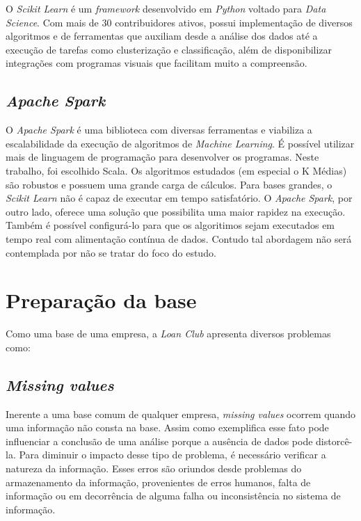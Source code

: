 O \emph{Scikit Learn} é um \emph{framework} desenvolvido em \emph{Python} voltado para \emph{Data Science}. Com mais de 30 contribuidores ativos, possui implementação de diversos algoritmos e de ferramentas que auxiliam desde a análise dos dados até a execução de tarefas como clusterização e classificação, além de disponibilizar integrações com programas visuais que facilitam muito a compreensão. 


\subsection{\emph{Apache Spark}}

O \emph{Apache Spark} é uma biblioteca com diversas ferramentas e viabiliza a escalabilidade da execução de algoritmos de \emph{Machine Learning}. É possível utilizar mais de linguagem de programação para desenvolver os programas. Neste trabalho, foi escolhido Scala.
Os algoritmos estudados (em especial o K Médias) são robustos e possuem uma grande carga de cálculos. Para bases grandes, o \emph{Scikit Learn} não é capaz de executar em tempo satisfatório. O \emph{Apache Spark}, por outro lado, oferece uma solução que possibilita uma maior rapidez na execução. Também é possível configurá-lo para que os algoritimos sejam executados em tempo real com alimentação contínua de dados. Contudo tal abordagem não será contemplada por não se tratar do foco do estudo.

\section{Preparação da base}

Como uma base de uma empresa, a \emph{Loan Club} apresenta diversos problemas como:

\subsection{\emph{Missing values}}
Inerente a uma base comum de qualquer empresa, \emph{missing values} ocorrem quando uma informação não consta na base. Assim como exemplifica  esse fato pode influenciar a conclusão de uma análise porque a ausência de dados pode distorcê-la. Para diminuir o impacto desse tipo de problema, é necessário verificar a natureza da informação. Esses erros são oriundos desde problemas do armazenamento da informação, provenientes de erros humanos, falta de informação ou em decorrência de alguma falha ou inconsistência no sistema de informação.

